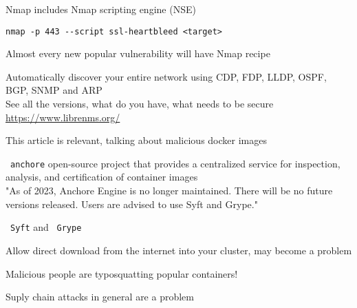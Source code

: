 \documentclass[Screen16to9,17pt]{foils}
\begin{document}

Nmap includes Nmap scripting engine (NSE)


\begin{list1}
\item \verb+nmap -p 443 --script ssl-heartbleed <target>+\\
\item Almost every new popular vulnerability will have Nmap recipe
\end{list1}




Automatically discover your entire network using CDP, FDP, LLDP, OSPF, BGP, SNMP and ARP \\
See all the versions, what do you have, what needs to be secure \url{https://www.librenms.org/}



This article is relevant, talking about malicious docker images\\



\begin{list2}
\item \faWrench\ \verb+anchore+ open-source project that provides a centralized service for inspection, analysis, and certification of container images
\\
"As of 2023, Anchore Engine is no longer maintained. There will be no future versions released. Users are advised to use Syft and Grype."
\item \faWrench\ \verb+Syft+  and \faWrench\ \verb+Grype+ 
\item Allow direct download from the internet into your cluster, may become a problem
\item Malicious people are typosquatting popular containers!
\item Suply chain attacks in general are a problem
\end{list2}
\end{document}
